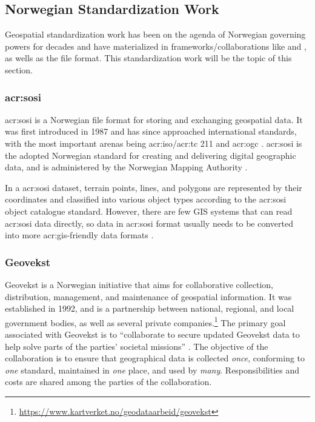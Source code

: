 \subsection{Norwegian Standardization Work}\label{subsec:standardization-norway}

Geospatial standardization work has been on the agenda of Norwegian governing powers for decades and have materialized in frameworks/collaborations like  and , as wells as the  file format. This standardization work will be the topic of this section.

\subsubsection[SOSI]{\acrshort{acr:sosi}}\label{subsubsec:sosi}

\gls{acr:sosi} is a Norwegian file format for storing and exchanging geospatial data. It was first introduced in 1987 and has since approached international standards, with the most important arenas being \acrshort{acr:iso}/\acrshort{acr:tc} 211 and \gls{acr:ogc} \citep{mardalNasjonalStrategiVidereutvikling2015}. \gls{acr:sosi} is the adopted Norwegian standard for creating and delivering digital geographic data, and is administered by the Norwegian Mapping Authority \citep{maehlumSOSI2023}.


In a \gls{acr:sosi} dataset, terrain points, lines, and polygons are represented by their coordinates and classified into various object types according to the \gls{acr:sosi} object catalogue standard. However, there are few GIS systems that can read \gls{acr:sosi} data directly, so data in \gls{acr:sosi} format usually needs to be converted into more \gls{acr:gis}-friendly data formats \citep{maehlumSOSI2023}.

\subsubsection{Geovekst}\label{subsubsec:geovekst}

Geovekst is a Norwegian initiative that aims for collaborative collection, distribution, management, and maintenance of geospatial information. It was established in 1992, and is a partnership between national, regional, and local government bodies, as well as several private companies.\footnote{\url{https://www.kartverket.no/geodataarbeid/geovekst}} The primary goal associated with Geovekst is to \enquote{collaborate to secure updated Geovekst data to help solve parts of the parties' societal missions} \citep[5]{thenorwegianmappingauthorityHandbokGeovekstsamarbeidet2023}. The objective of the collaboration is to ensure that geographical data is collected \textit{once}, conforming  to \textit{one} standard, maintained in \textit{one} place, and used by \textit{many}. Responsibilities and costs are shared among the parties of the collaboration.


